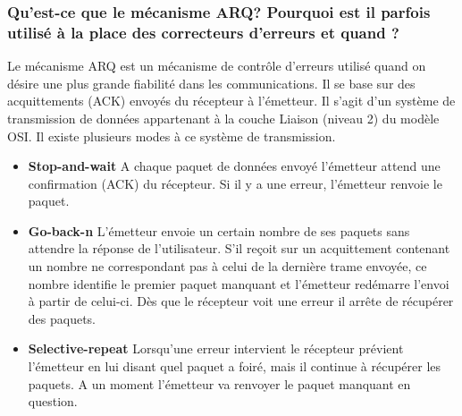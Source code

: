 \subsubsection{Qu'est-ce que le mécanisme ARQ? Pourquoi est il parfois
    utilisé à la place des correcteurs d'erreurs et quand ?}

Le mécanisme ARQ est un mécanisme de contrôle d'erreurs utilisé quand on désire une plus grande fiabilité dans les communications. Il se base sur des acquittements (ACK) envoyés du récepteur à l'émetteur.  Il s'agit d'un système de transmission de données appartenant à la couche Liaison (niveau 2) du modèle OSI. Il existe plusieurs modes à ce système de transmission.
\begin{itemize}
	\item \textbf{Stop-and-wait} A chaque paquet de données envoyé l'émetteur attend une confirmation (ACK) du récepteur. Si il y a une erreur, l'émetteur renvoie le paquet. 
	\item \textbf{Go-back-n} L'émetteur envoie un certain nombre de ses paquets sans attendre la réponse de l'utilisateur. S'il reçoit sur un acquittement contenant un nombre ne correspondant pas à celui de la dernière trame envoyée, ce nombre identifie le premier paquet manquant et l'émetteur redémarre l'envoi à partir de celui-ci. Dès que le récepteur voit une erreur il arrête de récupérer des paquets.
	\item \textbf{Selective-repeat} Lorsqu'une erreur intervient le récepteur prévient l'émetteur en lui disant quel paquet a foiré, mais il continue à récupérer les paquets. A un moment l'émetteur va renvoyer le paquet manquant en question.
\end{itemize}

